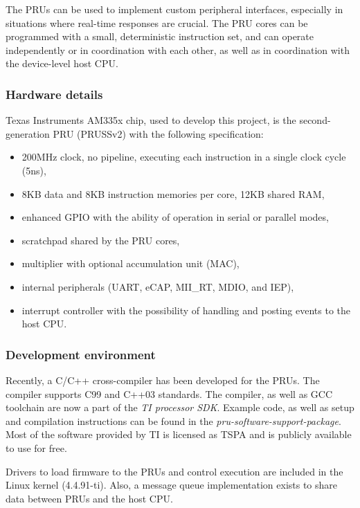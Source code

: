 \documentclass[a4,11pt]{article}
\begin{document}
The PRUs can be used to implement custom peripheral interfaces, especially in situations where real-time responses are crucial. The PRU cores can be programmed with a small, deterministic instruction set, and can operate independently or in coordination with each other, as well as in coordination with the device-level host CPU\cite{PRU}.

\subsubsection{Hardware details}
Texas Instruments AM335x chip, used to develop this project, is the second-generation PRU (PRUSSv2) with the following specification\cite{TRM}:
\begin{itemize}
    \setlength\itemsep{0em}
    \item 200MHz clock, no pipeline, executing each instruction in a single clock cycle (5ns),
    \item 8KB data and 8KB instruction memories per core, 12KB shared RAM,
    \item enhanced GPIO with the ability of operation in serial or parallel modes,
    \item scratchpad shared by the PRU cores,
    \item multiplier with optional accumulation unit (MAC),
    \item internal peripherals (UART, eCAP, MII\_RT, MDIO, and IEP),
    \item interrupt controller with the possibility of handling and posting events to the host CPU.
\end{itemize}

\subsubsection{Development environment}
Recently, a C/C++ cross-compiler has been developed for the PRUs. The compiler supports C99 and C++03 standards\cite{compiler}. The compiler, as well as GCC toolchain are now a part of the \textit{TI processor SDK}\cite{sdk}.
Example code, as well as setup and compilation instructions can be found in the \textit{pru-software-support-package}\cite{swpkg}. Most of the software provided by TI is licensed as TSPA and is publicly available to use for free.

Drivers to load firmware to the PRUs and control execution are included in the Linux kernel (4.4.91-ti).
Also, a message queue implementation exists to share data between PRUs and the host CPU\cite{rpmsg}.
\end{document}
